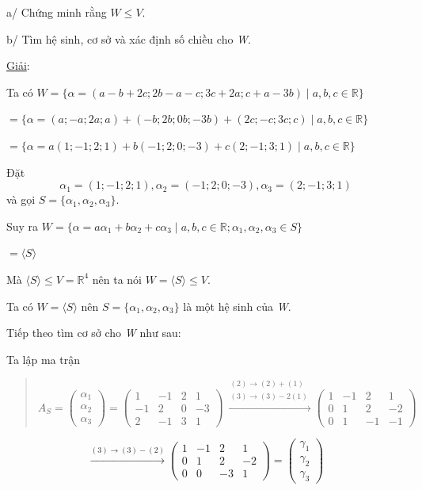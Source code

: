 \documentclass[12pt,a4paper]{article}
\newcommand{\ul}[1]{\uline{#1}}
\begin{document}
a/ Chứng minh rằng $W \le V$.

b/ Tìm hệ sinh, cơ sở và xác định số chiều cho \emph{W}.

\ul{Giải}:

Ta có $W = \{\alpha = (a - b + 2c; 2b - a - c; 3c + 2a; c + a - 3b) \mid a, b, c \in \mathbb{R}\}$

$= \{\alpha = (a; -a; 2a; a) + (-b; 2b; 0b; -3b) + (2c; -c; 3c; c) \mid a, b, c \in \mathbb{R}\}$

$= \{\alpha = a(1; -1; 2; 1) + b(-1; 2; 0; -3) + c(2; -1; 3; 1) \mid a, b, c \in \mathbb{R}\}$

Đặt
\[ \alpha_1 = (1; -1; 2; 1), \alpha_2 = (-1; 2; 0; -3), \alpha_3 = (2; -1; 3; 1) \]
và gọi $S = \{\alpha_1, \alpha_2, \alpha_3\}$.

Suy ra $W = \{ \alpha = a\alpha_1 + b\alpha_2 + c\alpha_3 \mid a, b, c \in \mathbb{R}; \alpha_1, \alpha_2, \alpha_3 \in S \}$

$= \langle S \rangle$

Mà $\langle S \rangle \le V = \mathbb{R}^4$ nên ta nói
$W = \langle S \rangle \le V$.

Ta có $W = \langle S \rangle$ nên
$S = \{\alpha_1, \alpha_2, \alpha_3\}$ là một hệ sinh của
\emph{W}.

Tiếp theo tìm cơ sở cho \emph{W} như sau:

Ta lập ma trận

\begin{quote}
\[A_S = \begin{pmatrix} \alpha_1 \\ \alpha_2 \\ \alpha_3 \end{pmatrix} = \begin{pmatrix} 1 & -1 & 2 & 1 \\ -1 & 2 & 0 & -3 \\ 2 & -1 & 3 & 1 \end{pmatrix} \xrightarrow{\substack{(2) \to (2) + (1) \\ (3) \to (3) - 2(1)}} \begin{pmatrix} 1 & -1 & 2 & 1 \\ 0 & 1 & 2 & -2 \\ 0 & 1 & -1 & -1 \end{pmatrix}\]
\end{quote}

\[\xrightarrow{(3) \to (3) - (2)} \begin{pmatrix} 1 & -1 & 2 & 1 \\ 0 & 1 & 2 & -2 \\ 0 & 0 & -3 & 1 \end{pmatrix} = \begin{pmatrix} \gamma_1 \\ \gamma_2 \\ \gamma_3 \end{pmatrix}\]
\end{document}

